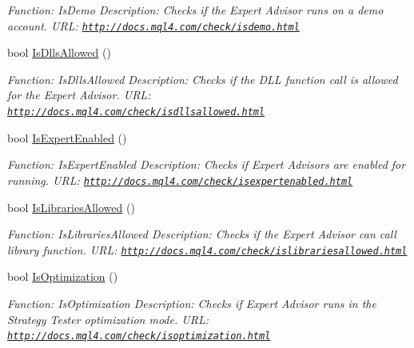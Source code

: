 \begin{DoxyCompactItemize}
\begin{DoxyCompactList}\small\item\em Function\+: Is\+Demo Description\+: Checks if the Expert Advisor runs on a demo account. U\+RL\+: \href{http://docs.mql4.com/check/isdemo.html}{\tt http\+://docs.\+mql4.\+com/check/isdemo.\+html} \end{DoxyCompactList}\item 
bool \hyperlink{class_m_q_l4_c_sharp_1_1_base_1_1_m_q_l_base_a1c6c4a1cf9f92e4a4e1cb82ca3af3ecc}{Is\+Dlls\+Allowed} ()
\begin{DoxyCompactList}\small\item\em Function\+: Is\+Dlls\+Allowed Description\+: Checks if the D\+LL function call is allowed for the Expert Advisor. U\+RL\+: \href{http://docs.mql4.com/check/isdllsallowed.html}{\tt http\+://docs.\+mql4.\+com/check/isdllsallowed.\+html} \end{DoxyCompactList}\item 
bool \hyperlink{class_m_q_l4_c_sharp_1_1_base_1_1_m_q_l_base_a4b24482b648a6054cd7daa0a26994f43}{Is\+Expert\+Enabled} ()
\begin{DoxyCompactList}\small\item\em Function\+: Is\+Expert\+Enabled Description\+: Checks if Expert Advisors are enabled for running. U\+RL\+: \href{http://docs.mql4.com/check/isexpertenabled.html}{\tt http\+://docs.\+mql4.\+com/check/isexpertenabled.\+html} \end{DoxyCompactList}\item 
bool \hyperlink{class_m_q_l4_c_sharp_1_1_base_1_1_m_q_l_base_a78ebcb8c086b1b7b14d19f28cace81c0}{Is\+Libraries\+Allowed} ()
\begin{DoxyCompactList}\small\item\em Function\+: Is\+Libraries\+Allowed Description\+: Checks if the Expert Advisor can call library function. U\+RL\+: \href{http://docs.mql4.com/check/islibrariesallowed.html}{\tt http\+://docs.\+mql4.\+com/check/islibrariesallowed.\+html} \end{DoxyCompactList}\item 
bool \hyperlink{class_m_q_l4_c_sharp_1_1_base_1_1_m_q_l_base_a876a67a483ce4f24308889eca96cfce3}{Is\+Optimization} ()
\begin{DoxyCompactList}\small\item\em Function\+: Is\+Optimization Description\+: Checks if Expert Advisor runs in the Strategy Tester optimization mode. U\+RL\+: \href{http://docs.mql4.com/check/isoptimization.html}{\tt http\+://docs.\+mql4.\+com/check/isoptimization.\+html} \end{DoxyCompactList}\item 

\end{DoxyCompactItemize}
